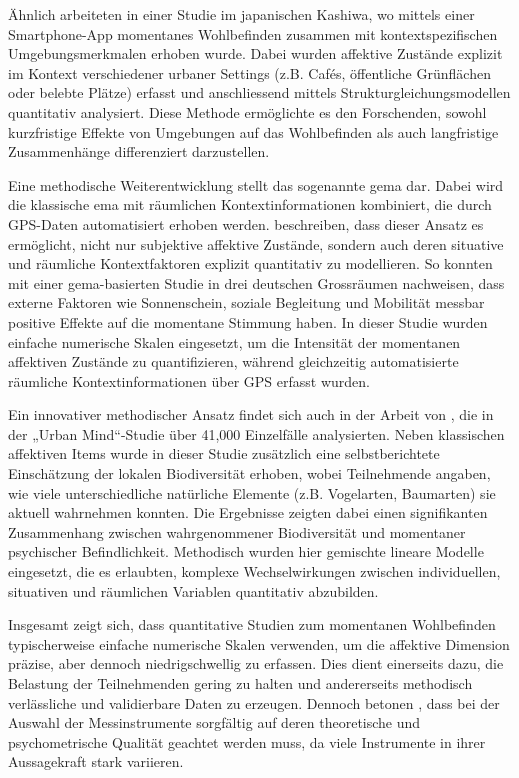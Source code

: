 Ähnlich arbeiteten \textcite{chenPerceivedUrbanEnvironment2025} in einer Studie im japanischen Kashiwa, wo mittels einer Smartphone-App momentanes Wohlbefinden zusammen mit kontextspezifischen Umgebungsmerkmalen erhoben wurde. Dabei wurden affektive Zustände explizit im Kontext verschiedener urbaner Settings (z.B. Cafés, öffentliche Grünflächen oder belebte Plätze) erfasst und anschliessend mittels Strukturgleichungsmodellen quantitativ analysiert. Diese Methode ermöglichte es den Forschenden, sowohl kurzfristige Effekte von Umgebungen auf das Wohlbefinden als auch langfristige Zusammenhänge differenziert darzustellen.

Eine methodische Weiterentwicklung stellt das sogenannte \gls{gema} dar. Dabei wird die klassische \gls{ema} mit räumlichen Kontextinformationen kombiniert, die durch GPS-Daten automatisiert erhoben werden. \textcite{kirchnerSpatiotemporalDeterminantsMental2016} beschreiben, dass dieser Ansatz es ermöglicht, nicht nur subjektive affektive Zustände, sondern auch deren situative und räumliche Kontextfaktoren explizit quantitativ zu modellieren. So konnten \textcite{mascherekMeadowsAsphaltRoad2025} mit einer \gls{gema}-basierten Studie in drei deutschen Grossräumen nachweisen, dass externe Faktoren wie Sonnenschein, soziale Begleitung und Mobilität messbar positive Effekte auf die momentane Stimmung haben. In dieser Studie wurden einfache numerische Skalen eingesetzt, um die Intensität der momentanen affektiven Zustände zu quantifizieren, während gleichzeitig automatisierte räumliche Kontextinformationen über GPS erfasst wurden.

Ein innovativer methodischer Ansatz findet sich auch in der Arbeit von \textcite{hammoudSmartphonebasedEcologicalMomentary2024}, die in der „Urban Mind“-Studie über 41,000 Einzelfälle analysierten. Neben klassischen affektiven Items wurde in dieser Studie zusätzlich eine selbstberichtete Einschätzung der lokalen Biodiversität erhoben, wobei Teilnehmende angaben, wie viele unterschiedliche natürliche Elemente (z.B. Vogelarten, Baumarten) sie aktuell wahrnehmen konnten. Die Ergebnisse zeigten dabei einen signifikanten Zusammenhang zwischen wahrgenommener Biodiversität und momentaner psychischer Befindlichkeit. Methodisch wurden hier gemischte lineare Modelle eingesetzt, die es erlaubten, komplexe Wechselwirkungen zwischen individuellen, situativen und räumlichen Variablen quantitativ abzubilden.

Insgesamt zeigt sich, dass quantitative Studien zum momentanen Wohlbefinden typischerweise einfache numerische Skalen verwenden, um die affektive Dimension präzise, aber dennoch niedrigschwellig zu erfassen. Dies dient einerseits dazu, die Belastung der Teilnehmenden gering zu halten und andererseits methodisch verlässliche und validierbare Daten zu erzeugen. Dennoch betonen \textcite{cookeMeasuringWellBeingReview2016}, dass bei der Auswahl der Messinstrumente sorgfältig auf deren theoretische und psychometrische Qualität geachtet werden muss, da viele Instrumente in ihrer Aussagekraft stark variieren.

